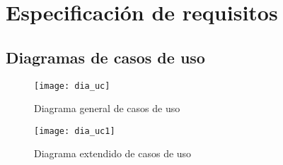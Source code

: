 \section{Especificación de requisitos}

\subsection{Diagramas de casos de uso}

\begin{figure}
\centering
\texttt{[image: dia\_uc]}
\caption{Diagrama general de casos de uso}
\label{fig:C.B.1}
\end{figure}

\begin{figure}
\centering
\texttt{[image: dia\_uc1]}
\caption{Diagrama extendido de casos de uso}
\label{fig:C.B.1}
\end{figure}




